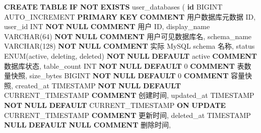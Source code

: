 \documentclass[
  a4paper,
  UTF8]{ctexart}
\newenvironment{Shaded}{}{}
\newcommand{\ControlFlowTok}[1]{\textcolor[rgb]{0.00,0.44,0.13}{\textbf{#1}}}
\newcommand{\DataTypeTok}[1]{\textcolor[rgb]{0.56,0.13,0.00}{#1}}
\newcommand{\DecValTok}[1]{\textcolor[rgb]{0.25,0.63,0.44}{#1}}
\newcommand{\FunctionTok}[1]{\textcolor[rgb]{0.02,0.16,0.49}{#1}}
\newcommand{\KeywordTok}[1]{\textcolor[rgb]{0.00,0.44,0.13}{\textbf{#1}}}
\newcommand{\NormalTok}[1]{#1}
\newcommand{\StringTok}[1]{\textcolor[rgb]{0.25,0.44,0.63}{#1}}
\begin{document}
\begin{Shaded}
\begin{Highlighting}[]
\KeywordTok{CREATE} \KeywordTok{TABLE} \ControlFlowTok{IF} \KeywordTok{NOT} \KeywordTok{EXISTS}\NormalTok{ user\_databases (}
  \KeywordTok{id}\NormalTok{ BIGINT AUTO\_INCREMENT }\KeywordTok{PRIMARY} \KeywordTok{KEY} \KeywordTok{COMMENT} \StringTok{\textquotesingle{}用户数据库元数据 ID\textquotesingle{}}\NormalTok{,}
\NormalTok{  user\_id }\DataTypeTok{INT} \KeywordTok{NOT} \KeywordTok{NULL} \KeywordTok{COMMENT} \StringTok{\textquotesingle{}用户 ID\textquotesingle{}}\NormalTok{,}
\NormalTok{  display\_name }\DataTypeTok{VARCHAR}\NormalTok{(}\DecValTok{64}\NormalTok{) }\KeywordTok{NOT} \KeywordTok{NULL} \KeywordTok{COMMENT} \StringTok{\textquotesingle{}用户可见数据库名\textquotesingle{}}\NormalTok{,}
\NormalTok{  schema\_name }\DataTypeTok{VARCHAR}\NormalTok{(}\DecValTok{128}\NormalTok{) }\KeywordTok{NOT} \KeywordTok{NULL} \KeywordTok{COMMENT} \StringTok{\textquotesingle{}实际 MySQL schema 名称\textquotesingle{}}\NormalTok{,}
\NormalTok{  status ENUM(}\StringTok{\textquotesingle{}active\textquotesingle{}}\NormalTok{, }\StringTok{\textquotesingle{}deleting\textquotesingle{}}\NormalTok{, }\StringTok{\textquotesingle{}deleted\textquotesingle{}}\NormalTok{) }\KeywordTok{NOT} \KeywordTok{NULL} \KeywordTok{DEFAULT} \StringTok{\textquotesingle{}active\textquotesingle{}} \KeywordTok{COMMENT} \StringTok{\textquotesingle{}数据库状态\textquotesingle{}}\NormalTok{,}
\NormalTok{  table\_count }\DataTypeTok{INT} \KeywordTok{NOT} \KeywordTok{NULL} \KeywordTok{DEFAULT} \DecValTok{0} \KeywordTok{COMMENT} \StringTok{\textquotesingle{}表数量快照\textquotesingle{}}\NormalTok{,}
\NormalTok{  size\_bytes BIGINT }\KeywordTok{NOT} \KeywordTok{NULL} \KeywordTok{DEFAULT} \DecValTok{0} \KeywordTok{COMMENT} \StringTok{\textquotesingle{}容量快照\textquotesingle{}}\NormalTok{,}
\NormalTok{  created\_at }\DataTypeTok{TIMESTAMP} \KeywordTok{NOT} \KeywordTok{NULL} \KeywordTok{DEFAULT} \FunctionTok{CURRENT\_TIMESTAMP} \KeywordTok{COMMENT} \StringTok{\textquotesingle{}创建时间\textquotesingle{}}\NormalTok{,}
\NormalTok{  updated\_at }\DataTypeTok{TIMESTAMP} \KeywordTok{NOT} \KeywordTok{NULL} \KeywordTok{DEFAULT} \FunctionTok{CURRENT\_TIMESTAMP} \KeywordTok{ON} \KeywordTok{UPDATE} \FunctionTok{CURRENT\_TIMESTAMP} \KeywordTok{COMMENT} \StringTok{\textquotesingle{}更新时间\textquotesingle{}}\NormalTok{,}
\NormalTok{  deleted\_at }\DataTypeTok{TIMESTAMP} \KeywordTok{NULL} \KeywordTok{DEFAULT} \KeywordTok{NULL} \KeywordTok{COMMENT} \StringTok{\textquotesingle{}删除时间\textquotesingle{}}\NormalTok{,}


\end{Highlighting}
\end{Shaded}
\end{document}
